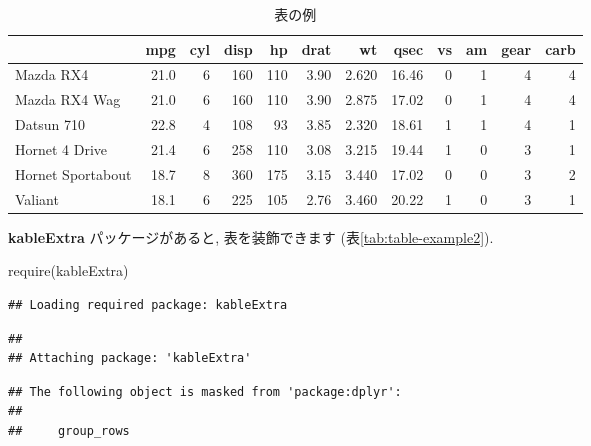 \documentclass[
]{bxjsarticle}
\newenvironment{Shaded}{\begin{snugshade}}{\end{snugshade}}
\newcommand{\FunctionTok}[1]{\textcolor[rgb]{0.00,0.00,0.00}{#1}}
\newcommand{\NormalTok}[1]{#1}
\begin{document}
\begin{table}

\caption{\label{tab:table-example}表の例}
\centering
\begin{tabular}[t]{lrrrrrrrrrrr}
\toprule
  & mpg & cyl & disp & hp & drat & wt & qsec & vs & am & gear & carb\\
\midrule
Mazda RX4 & 21.0 & 6 & 160 & 110 & 3.90 & 2.620 & 16.46 & 0 & 1 & 4 & 4\\
Mazda RX4 Wag & 21.0 & 6 & 160 & 110 & 3.90 & 2.875 & 17.02 & 0 & 1 & 4 & 4\\
Datsun 710 & 22.8 & 4 & 108 & 93 & 3.85 & 2.320 & 18.61 & 1 & 1 & 4 & 1\\
Hornet 4 Drive & 21.4 & 6 & 258 & 110 & 3.08 & 3.215 & 19.44 & 1 & 0 & 3 & 1\\
Hornet Sportabout & 18.7 & 8 & 360 & 175 & 3.15 & 3.440 & 17.02 & 0 & 0 & 3 & 2\\
\addlinespace
Valiant & 18.1 & 6 & 225 & 105 & 2.76 & 3.460 & 20.22 & 1 & 0 & 3 & 1\\
\bottomrule
\end{tabular}
\end{table}

\textbf{kableExtra} パッケージがあると, 表を装飾できます (表\ref{tab:table-example2}).

\begin{Shaded}
\begin{Highlighting}[numbers=left,,]
\FunctionTok{require}\NormalTok{(kableExtra)}
\end{Highlighting}
\end{Shaded}

\begin{verbatim}
## Loading required package: kableExtra
\end{verbatim}

\begin{verbatim}
## 
## Attaching package: 'kableExtra'
\end{verbatim}

\begin{verbatim}
## The following object is masked from 'package:dplyr':
## 
##     group_rows
\end{verbatim}
\end{document}
